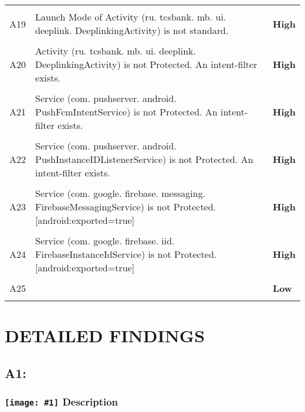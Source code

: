 \documentclass[12p]{article}
\newcommand{\icon}[1]{\texttt{[image: \#1]}}
\begin{document}
\begin{longtable}{p{0.5cm} p{10cm} p{1.5cm}}
\hline\\	A19&Launch Mode of Activity \newline (ru. tcsbank. mb. ui. deeplink. DeeplinkingActivity) is not standard.& \color{ferrarired}\textbf{High} \\
\hline\\	A20&Activity \newline (ru. tcsbank. mb. ui. deeplink. DeeplinkingActivity) is not Protected. An intent-filter exists.& \color{ferrarired}\textbf{High} \\
\hline\\	A21&Service \newline (com. pushserver. android. PushFcmIntentService) is not Protected. An intent-filter exists.& \color{ferrarired}\textbf{High} \\
\hline\\	A22&Service \newline (com. pushserver. android. PushInstanceIDListenerService) is not Protected. An intent-filter exists.& \color{ferrarired}\textbf{High} \\
\hline\\	A23&Service \newline (com. google. firebase. messaging. FirebaseMessagingService) is not Protected. [android:exported=true]& \color{ferrarired}\textbf{High} \\
\hline\\	A24&Service \newline (com. google. firebase. iid. FirebaseInstanceIdService) is not Protected. [android:exported=true]& \color{ferrarired}\textbf{High} \\
\hline\\	A25&& \color{amber}\textbf{Low} \\
\hline\\	\end{longtable}
\cleardoublepage
\newpage
\section{DETAILED FINDINGS}
\subsection{A1: }
\subsubsection*{\protect\icon{/home/miki/Documents/GITHUB/AndroidPermissions/python/vulns/report_icons/basic_sheet.png} Description}
\end{document}
